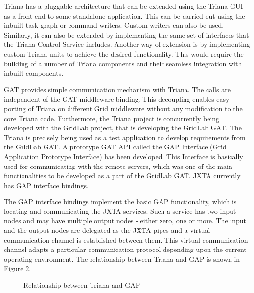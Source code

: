 \documentclass[9pt,twocolumn,twoside]{../../styles/osajnl}
\begin{document}
Triana has a pluggable architecture that can be extended using the 
Triana GUI as a front end to some standalone application. This can be 
carried out using the inbuilt task-graph or command writers. Custom 
writers can also be used. Similarly, it can also be extended by 
implementing the same set of interfaces that the Triana Control Service 
includes. Another way of extension is by implementing custom Triana 
units to achieve the desired functionality. This would require the 
building of a number of Triana components and their seamless integration 
with inbuilt components.

GAT provides simple communication mechanism with Triana. The calls are 
independent of the GAT middleware binding. This decoupling enables easy 
porting of Triana on different Grid middleware without any modification 
to the core Triana code. Furthermore, the Triana project is concurrently 
being developed with the GridLab project, that is developing the GridLab 
GAT. The Triana is precisely being used as a test application to develop 
requirements from the GridLab GAT. A prototype GAT API called the GAP 
Interface (Grid Application Prototype Interface) has been developed. 
This Interface is basically used for communicating with the remote 
servers, which was one of the main functionalities to be developed as a 
part of the GridLab GAT. JXTA currently has GAP interface bindings. 

The GAP interface bindings implement the basic GAP functionality,
which is locating and communicating the JXTA services. Such a service
has two input nodes and may have multiple output nodes - either zero,
one or more. The input and the output nodes are delegated as the JXTA
pipes and a virtual communication channel is established between
them. This virtual communication channel adapts a particular
communication protocol depending upon the current operating
environment. The relationship between Triana and GAP is shown in
Figure 2.

\begin{figure}[htbp]
  \centering
  \caption{Relationship between Triana and GAP \cite{TrianaDocumentation1}}
\end{figure}
\end{document}

